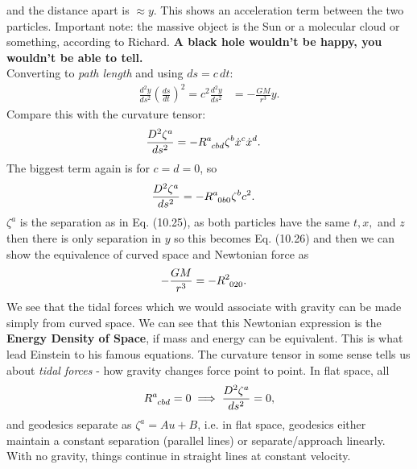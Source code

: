 \documentclass[a4paper, 11pt, normalem]{report}
\begin{document}
and the distance apart is $\approx y$.
This shows an acceleration term between the two particles. 
Important note: the massive object is the Sun or a molecular cloud or something, according to Richard.
\textbf{A black hole wouldn't be happy, you wouldn't be able to tell.}\\
Converting to \emph{path length} and using $ds=c\,dt$:
\begin{align}
    \frac{d^2y}{ds^2}\left(\frac{ds}{dt}\right)^2 = c^2\frac{d^2y}{ds^2} &= -\frac{GM}{r^3}y.
\end{align}
Compare this with the curvature tensor:
\begin{align}
    \frac{D^2\zeta^a}{ds^2} &= -\tensor{R}{^a_{cbd}}\zeta^b\dot{x}^c\dot{x}^d.
\end{align}
The biggest term again is for $c=d=0$, so
\begin{align}
    \frac{D^2\zeta^a}{ds^2} &= -\tensor{R}{^a_{0b0}}\zeta^bc^2.
\end{align}
$\zeta^a$ is the separation as in Eq. (10.25), as both particles have the same $t,x,$ and $z$ then there is only separation in $y$ so this becomes Eq. (10.26) and then we can show the equivalence of curved space and Newtonian force as
\begin{align}
    -\frac{GM}{r^3} &= -\tensor{R}{^2_{020}}.
\end{align}
We see that the tidal forces which we would associate with gravity can be made simply from curved space. 
We can see that this Newtonian expression is the \textbf{Energy Density of Space}, if mass and energy can be equivalent.
This is what lead Einstein to his famous equations.
The curvature tensor in some sense tells us about \emph{tidal forces} - how gravity changes force point to point. 
In flat space, all
\begin{align}
    \tensor{R}{^a_{cbd}} = 0 \implies \frac{D^2\zeta^a}{ds^2} = 0,
\end{align}
and geodesics separate as $\zeta^a=Au+B$, i.e. in flat space, geodesics either maintain a constant separation (parallel lines) or separate/approach linearly. 
With no gravity, things continue in straight lines at constant velocity. 
\end{document}
